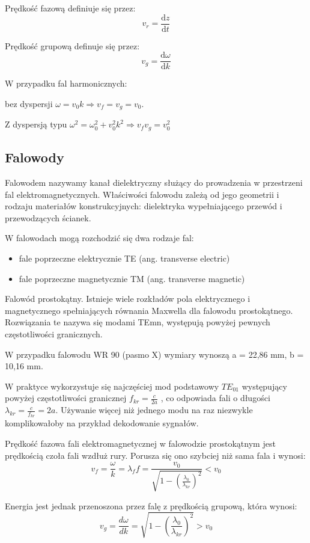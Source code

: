 \documentclass[a4paper,11pt]{article}
\begin{document}
Prędkość fazową definiuje się przez:
\[ v_r  =  \frac{\mathrm d z}{\mathrm d t} \]

Prędkość grupową definuje się przez:
\[ v_g = \frac{\mathrm d \omega }{\mathrm d k} \]

W przypadku fal harmonicznych:

bez dyspersji \( \omega = v_0 k \Rightarrow v_f = v_g = v_0 \).

Z dyspersją typu \( \omega ^2 = \omega _0 ^2 + v_0^2 k^2 \Rightarrow v_f v_g = v_0^2 \)

\subsection{Falowody}
Falowodem nazywamy kanał dielektryczny służący do prowadzenia w przestrzeni fal elektromagnetycznych. Właściwości falowodu zależą od jego geometrii i rodzaju materiałów konstrukcyjnych: dielektryka wypełniającego przewód i przewodzących ścianek.

W falowodach mogą rozchodzić się dwa rodzaje fal:
\begin{itemize}
\item fale poprzeczne elektrycznie TE (ang. transverse electric)
\item fale poprzeczne magnetycznie TM (ang. transverse magnetic)
\end{itemize}


Falowód prostokątny.
Istnieje wiele rozkładów pola elektrycznego i magnetycznego spełniających  równania Maxwella dla falowodu prostokątnego. Rozwiązania te nazywa się modami TEmn, występują powyżej pewnych częstotliwości granicznych.

W przypadku falowodu WR 90 (pasmo X) wymiary wynoszą a = 22,86 mm,  b = 10,16 mm.

W praktyce wykorzystuje się najczęściej mod podstawowy \( TE_{01} \) występujący powyżej częstotliwości granicznej \( f_{kr} = \frac{c} { 2a} \) ,  co odpowiada fali o długości \( \lambda _{kr} = \frac {c } { f_{kr} } = 2a\). Używanie więcej niż jednego modu na raz niezwykle komplikowałoby na przykład dekodowanie sygnałów.


Prędkość fazowa fali elektromagnetycznej w falowodzie prostokątnym jest prędkością czoła fali wzdłuż rury. Porusza się ono szybciej niż sama fala i wynosi:
\[ v_f = \frac {\omega } {k} = \lambda _f f =  \frac {v_0} { \sqrt {1 - \left( \frac { \lambda _0} { \lambda _{kr} } \right) ^2}   } < v_0 \]

Energia jest jednak przenoszona przez falę z prędkością grupową, która wynosi:
\[  v_g = \frac { d \omega } {d k} = { \sqrt {1 - \left( \frac { \lambda _0} { \lambda _{kr} } \right) ^2}   } > v_0   \]
\end{document}
